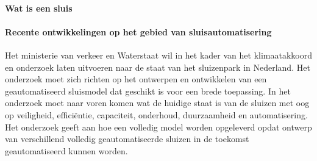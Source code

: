\paragraph{Wat is een sluis}

\paragraph{Recente ontwikkelingen op het gebied van sluisautomatisering}

Het ministerie van verkeer en Waterstaat wil in het kader van het klimaatakkoord en onderzoek laten uitvoeren naar de staat van het sluizenpark in Nederland. Het onderzoek moet zich richten op het ontwerpen en ontwikkelen van een geautomatiseerd sluismodel dat geschikt is voor een brede toepassing. In het onderzoek moet naar voren komen wat de huidige staat is van de sluizen met oog op veiligheid, efficiëntie, capaciteit, onderhoud, duurzaamheid en automatisering. Het onderzoek geeft aan hoe een volledig model worden opgeleverd opdat ontwerp van verschillend volledig geautomatiseerde sluizen in de toekomst geautomatiseerd kunnen worden.  


